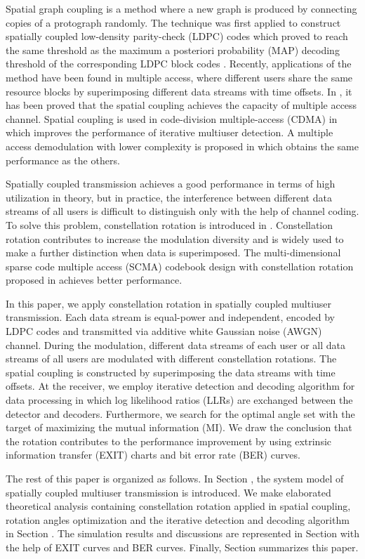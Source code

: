 \documentclass[conference]{IEEEtran}
\begin{document}
Spatial graph coupling is a method where a new graph is produced by connecting copies of a protograph randomly. The technique was first applied to construct spatially coupled low-density parity-check (LDPC) codes \cite{4} which proved to reach the same threshold as the maximum a posteriori probability (MAP) decoding threshold of the corresponding LDPC block codes \cite{5}. Recently, applications of the method have been found in multiple access, where different users share the same resource blocks by superimposing different data streams with time offsets. In \cite{6}, it has been proved that the spatial coupling achieves the capacity of multiple access channel. Spatial coupling is used in code-division multiple-access (CDMA) in \cite{7} which improves the performance of iterative multiuser detection. A multiple access demodulation with lower complexity is proposed in \cite{8} which obtains the same performance as the others.

Spatially coupled transmission achieves a good performance in terms of high utilization in theory, but in practice, the interference between different data streams of all users is difficult to distinguish only with the help of channel coding. To solve this problem, constellation rotation is introduced in \cite{9}. Constellation rotation contributes to increase the modulation diversity and is widely used to make a further distinction when data is superimposed. The multi-dimensional sparse code multiple access (SCMA) codebook design with constellation rotation proposed in \cite{10} achieves better performance.

In this paper, we apply constellation rotation in spatially coupled multiuser transmission. Each data stream is equal-power and independent, encoded by LDPC codes and transmitted via additive white Gaussian noise (AWGN) channel. During the modulation, different data streams of each user or all data streams of all users are modulated with different constellation rotations. The spatial coupling is constructed by superimposing the data streams with time offsets. At the receiver, we employ iterative detection and decoding algorithm for data processing in which log likelihood ratios (LLRs) are exchanged between the detector and decoders. Furthermore, we search for the optimal angle set with the target of maximizing the mutual information (MI). We draw the conclusion that the rotation contributes to the performance improvement by using extrinsic information transfer (EXIT) charts and bit error rate (BER) curves.

The rest of this paper is organized as follows. In Section \uppercase\expandafter{}, the system model of spatially coupled multiuser transmission is introduced. We make elaborated theoretical analysis containing constellation rotation applied in spatial coupling, rotation angles optimization and the iterative detection and decoding algorithm in Section \uppercase\expandafter{}. The simulation results and discussions are represented in Section \uppercase\expandafter{} with the help of EXIT curves and BER curves. Finally, Section \uppercase\expandafter{} summarizes this paper.
\end{document}
